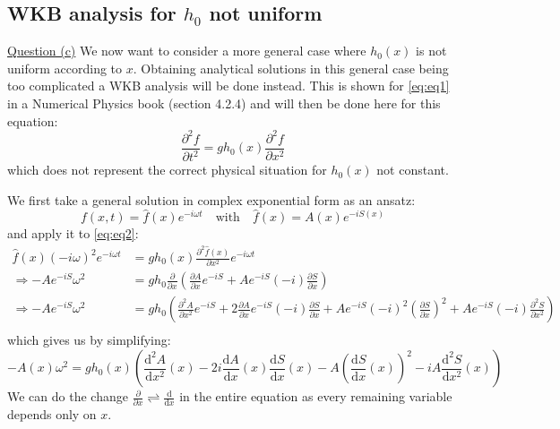 \subsection{WKB analysis for $h_0$ not uniform}
\underline{Question (c)}
We now want to consider a more general case where $h_0(x)$ is not uniform according to $x$. Obtaining analytical solutions in this general case being too complicated a WKB analysis will be done instead. This is shown for \autoref{eq:eq1} in a Numerical Physics book \cite{physnumbook} (section 4.2.4) and will then be done here for this equation:
\begin{equation}
    \frac{\partial^2 f}{\partial t^2} = g h_0(x) \frac{\partial^2 f}{\partial x^2}
    \label{eq:eq2}
\end{equation}
which does not represent the correct physical situation for $h_0(x)$ not constant.

We first take a general solution in complex exponential form as an ansatz:
\begin{equation}
    f(x,t) = \hat{f}(x)e^{-i\omega t} \quad \mathrm{with} \quad
    \hat{f}(x) = A(x)e^{-iS(x)}
    \label{eq:ansatz}
\end{equation}
and apply it to \autoref{eq:eq2}:
\[
    \begin{aligned}
        \hat{f}(x)(-i\omega)^2e^{-i\omega t} &= gh_0(x)\frac{\partial^2 \hat{f}(x)}{\partial x^2} e^{-i\omega t} \\
        \Rightarrow -Ae^{-iS}\omega^2 &= gh_0 \frac{\partial}{\partial x}\left(\frac{\partial A}{\partial x}e^{-iS} + Ae^{-iS}(-i)\frac{\partial S}{\partial x}\right) \\
        \Rightarrow -Ae^{-iS}\omega^2 &= gh_0 \left(\frac{\partial^2 A}{\partial x^2}e^{-iS} + 2 \frac{\partial A}{\partial x}e^{-iS}(-i)\frac{\partial S}{\partial x} + Ae^{-iS}(-i)^2\left(\frac{\partial S}{\partial x}\right)^2 + Ae^{-iS}(-i)\frac{\partial^2 S}{\partial x^2} \right) \\
    \end{aligned}    
\]
which gives us by simplifying:
\begin{equation}
    -A(x)\omega^2 = gh_0(x)\left(\frac{\mathrm{d}^2 A}{\mathrm{d} x^2}(x) - 2i \frac{\mathrm{d} A}{\mathrm{d} x}(x)\frac{\mathrm{d} S}{\mathrm{d} x}(x) - A\left(\frac{\mathrm{d} S}{\mathrm{d} x}(x)\right)^2 - iA\frac{\mathrm{d}^2 S}{\mathrm{d} x^2}(x)\right)
    \label{eq:equation_exponential_wkb}
\end{equation}
We can do the change $\frac{\partial}{\partial x} \rightleftharpoons \frac{\mathrm{d}}{\mathrm{d}x}$ in the entire equation as every remaining variable depends only on $x$.

